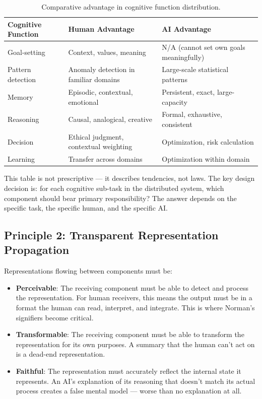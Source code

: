 \documentclass[11pt,a4paper]{article}
\begin{document}
\begin{table}[ht]
\centering
\caption{Comparative advantage in cognitive function distribution.}
\label{tab:comparative_advantage}
\begin{tabular}{@{}lll@{}}
\toprule
\textbf{Cognitive Function} & \textbf{Human Advantage} & \textbf{AI Advantage} \\
\midrule
Goal-setting      & Context, values, meaning            & N/A (cannot set own goals meaningfully) \\
Pattern detection  & Anomaly detection in familiar domains & Large-scale statistical patterns \\
Memory            & Episodic, contextual, emotional      & Persistent, exact, large-capacity \\
Reasoning         & Causal, analogical, creative         & Formal, exhaustive, consistent \\
Decision          & Ethical judgment, contextual weighting & Optimization, risk calculation \\
Learning          & Transfer across domains              & Optimization within domain \\
\bottomrule
\end{tabular}
\end{table}

This table is not prescriptive --- it describes tendencies, not laws. The key design decision is: for each cognitive sub-task in the distributed system, which component should bear primary responsibility? The answer depends on the specific task, the specific human, and the specific AI.

\subsection{Principle 2: Transparent Representation Propagation}

Representations flowing between components must be:
\begin{itemize}[leftmargin=*, itemsep=2pt]
  \item \textbf{Perceivable}: The receiving component must be able to detect and process the representation. For human receivers, this means the output must be in a format the human can read, interpret, and integrate. This is where Norman's signifiers become critical.
  \item \textbf{Transformable}: The receiving component must be able to transform the representation for its own purposes. A summary that the human can't act on is a dead-end representation.
  \item \textbf{Faithful}: The representation must accurately reflect the internal state it represents. An AI's explanation of its reasoning that doesn't match its actual process creates a false mental model --- worse than no explanation at all.
\end{itemize}
\end{document}
